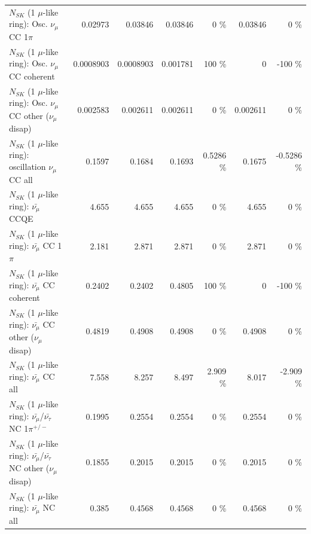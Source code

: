 \begin{table}
\begin{tabular}{| l | r | r | r  r | r  r |}
                          $N_{SK}$ (1 $\mu$-like ring): Osc. $\nu_\mu$ CC 1$\pi$ &         0.02973 &         0.03846 &         0.03846 &        0 \%  &         0.03846 &        0 \%  \\ 
                        $N_{SK}$ (1 $\mu$-like ring): Osc. $\nu_\mu$ CC coherent &       0.0008903 &       0.0008903 &        0.001781 &      100 \%  &               0 &     -100 \%  \\ 
         $N_{SK}$ (1 $\mu$-like ring): Osc. $\nu_\mu$ CC other ($\nu_\mu$ disap) &        0.002583 &        0.002611 &        0.002611 &        0 \%  &        0.002611 &        0 \%  \\ 
                      $N_{SK}$ (1 $\mu$-like ring): oscillation $\nu_\mu$ CC all &          0.1597 &          0.1684 &          0.1693 &   0.5286 \%  &          0.1675 &  -0.5286 \%  \\ 
\hline
\hline
                              $N_{SK}$ (1 $\mu$-like ring): $\bar{\nu_\mu}$ CCQE &           4.655 &           4.655 &           4.655 &        0 \%  &           4.655 &        0 \%  \\ 
                         $N_{SK}$ (1 $\mu$-like ring): $\bar{\nu_\mu}$ CC 1$\pi$ &           2.181 &           2.871 &           2.871 &        0 \%  &           2.871 &        0 \%  \\ 
                       $N_{SK}$ (1 $\mu$-like ring): $\bar{\nu_\mu}$ CC coherent &          0.2402 &          0.2402 &          0.4805 &      100 \%  &               0 &     -100 \%  \\ 
        $N_{SK}$ (1 $\mu$-like ring): $\bar{\nu_\mu}$ CC other ($\nu_\mu$ disap) &          0.4819 &          0.4908 &          0.4908 &        0 \%  &          0.4908 &        0 \%  \\ 
                          $N_{SK}$ (1 $\mu$-like ring): $\bar{\nu_{\mu}}$ CC all &           7.558 &           8.257 &           8.497 &    2.909 \%  &           8.017 &   -2.909 \%  \\ 
\hline
  $N_{SK}$ (1 $\mu$-like ring): $\bar{\nu_\mu}$/$\bar{\nu_\tau}$ NC 1$\pi^{+/-}$ &          0.1995 &          0.2554 &          0.2554 &        0 \%  &          0.2554 &        0 \%  \\ 
$N_{SK}$ (1 $\mu$-like ring): $\bar{\nu_\mu}$/$\bar{\nu_\tau}$ NC other ($\nu_\mu$ disap) &          0.1855 &          0.2015 &          0.2015 &        0 \%  &          0.2015 &        0 \%  \\ 
                          $N_{SK}$ (1 $\mu$-like ring): $\bar{\nu_{\mu}}$ NC all &           0.385 &          0.4568 &          0.4568 &        0 \%  &          0.4568 &        0 \%  \\ 

\end{tabular}
\end{table}
